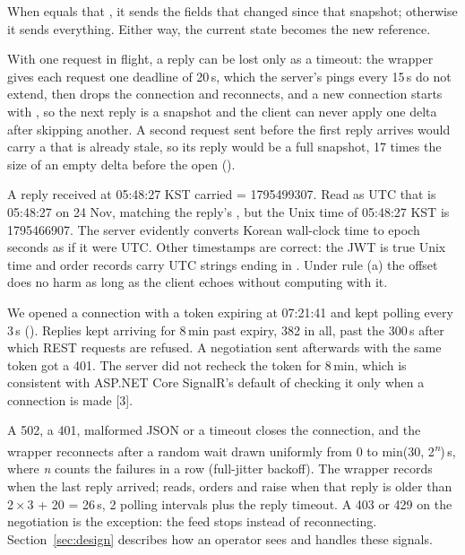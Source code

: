 

 When  equals that , it sends the fields that changed since that snapshot; otherwise it sends everything. Either way, the current state becomes the new reference.

 With one request in flight, a reply can be lost only as a timeout: the wrapper gives each request one deadline of 20\,s, which the server's pings every 15\,s do not extend, then drops the connection and reconnects, and a new connection starts with , so the next reply is a snapshot and the client can never apply one delta after skipping another. A second request sent before the first reply arrives would carry a  that is already stale, so its reply would be a full snapshot, 17 times the size of an empty delta before the open ().

 A reply received at 05:48:27 KST carried  = 1795499307. Read as UTC that is 05:48:27 on 24 Nov, matching the reply's , but the Unix time of 05:48:27 KST is 1795466907. The server evidently converts Korean wall-clock time to epoch seconds as if it were UTC. Other timestamps are correct: the JWT  is true Unix time and order records carry UTC strings ending in . Under rule (a) the offset does no harm as long as the client echoes  without computing with it.

 We opened a connection with a token expiring at 07:21:41 and kept polling every 3\,s (). Replies kept arriving for 8\,min past expiry, 382 in all, past the 300\,s after which REST requests are refused. A negotiation sent afterwards with the same token got a 401. The server did not recheck the token for 8\,min, which is consistent with ASP.NET Core SignalR's default of checking it only when a connection is made [3].

 A 502, a 401, malformed JSON or a timeout closes the connection, and the wrapper reconnects after a random wait drawn uniformly from 0 to min(30, 2\textsuperscript{\textit{n}})\,s, where \textit{n} counts the failures in a row (full-jitter backoff). The wrapper records when the last reply arrived; reads, orders and  raise  when that reply is older than 2\,×\,3 + 20 = 26\,s, 2 polling intervals plus the reply timeout. A 403 or 429 on the negotiation is the exception: the feed stops instead of reconnecting. Section~\ref{sec:design} describes how an operator sees and handles these signals.

